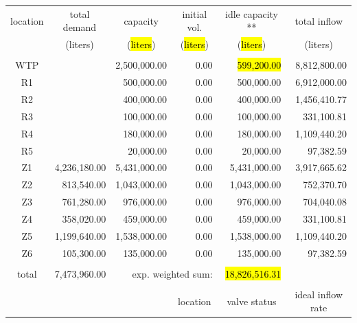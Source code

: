 \documentclass{singlecol}
\theoremstyle{TH}{
\newtheorem{lemma}{Lemma}
\newtheorem{theorem}[lemma]{Theorem}
\newtheorem{corrolary}[lemma]{Corrolary}
\newtheorem{conjecture}[lemma]{Conjecture}
\newtheorem{proposition}[lemma]{Proposition}
\newtheorem{claim}[lemma]{Claim}
\newtheorem{stheorem}[lemma]{Wrong Theorem}
\newtheorem{algorithm}{Algorithm}
}
\theoremstyle{THrm}{
\newtheorem{definition}{Definition}[section]
\newtheorem{question}{Question}[section]
\newtheorem{remark}{Remark}
\newtheorem{scheme}{Scheme}
}
\theoremstyle{THhit}{
\newtheorem{case}{Case}[section]
}
\begin{document}
\begin{table}[t]
\begin{center}
\begin{small}
	\begin{tabular}{ c r r r r r } 
		location & \multicolumn{1}{c}{total demand}      & \multicolumn{1}{c}{capacity} & \multicolumn{1}{c}{initial vol.} & \multicolumn{1}{c}{idle capacity **} & \multicolumn{1}{c}{total inflow}  \\
		      & \multicolumn{1}{c}{(liters)} & \multicolumn{1}{c}{(\hl{liters})}   & \multicolumn{1}{c}{(\hl{liters})}     &  \multicolumn{1}{c}{(\hl{liters})}   &  \multicolumn{1}{c}{(liters)}               \\
		\\
		WTP   &              & 2,500,000.00 & 0.00 &  \hl{599,200.00} & 8,812,800.00 \\
		R1    &              &   500,000.00 & 0.00 &    500,000.00 & 6,912,000.00 \\
		R2    &              &   400,000.00 & 0.00 &    400,000.00 & 1,456,410.77 \\
		R3    &              &   100,000.00 & 0.00 &    100,000.00 &   331,100.81 \\
	    R4    &              &   180,000.00 & 0.00 &    180,000.00 & 1,109,440.20  \\
	    R5    &              &    20,000.00 & 0.00 &     20,000.00 &    97,382.59 \\
	    Z1    & 4,236,180.00 & 5,431,000.00 & 0.00 &  5,431,000.00 & 3,917,665.62 \\
	    Z2    &   813,540.00 & 1,043,000.00 & 0.00 &  1,043,000.00 &   752,370.70 \\
	    Z3    &   761,280.00 &   976,000.00 & 0.00 &    976,000.00 &   704,040.08 \\
	    Z4    &   358,020.00 &   459,000.00 & 0.00 &    459,000.00 &   331,100.81 \\
	    Z5    & 1,199,640.00 & 1,538,000.00 & 0.00 &  1,538,000.00 & 1,109,440.20 \\
	    Z6    &   105,300.00 &   135,000.00 & 0.00 &    135,000.00 &    97,382.59 \\
	    \\
	    total & 7,473,960.00 & \multicolumn{2}{r}{exp. weighted sum:} & \hl{18,826,516.31} &              \\
		   \\
		&  &      &  \multicolumn{1}{c}{location}    & \multicolumn{1}{c}{valve status} & \multicolumn{1}{c}{ideal inflow rate}   \\

\end{tabular}
\end{small}
\end{center}
\end{table}
\end{document}
